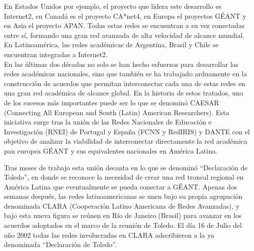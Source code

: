En Estados Unidos por ejemplo, el proyecto que lidera este desarrollo es Internet2\citep{Internet2}, en Canadá es el proyecto CA*net4\citep{Canarie}, en Europa el proyectos GÉANT\citep{GEANT} y en Asia el proyecto APAN\citep{APAN}. Todas estas redes se encuentran a su vez conectadas entre sí, formando una gran red avanzada de alta velocidad de alcance mundial. En Latinoamérica, las redes académicas de Argentina, Brasil y Chile se encuentran integradas a Internet2.\\

En las \'ultimas dos d\'ecadas no solo se han hecho esfuerzos para desarrollar las redes académicas nacionales, sino que también se ha trabajado arduamente en la construcción de acuerdos que permitan interconectar cada una de estas redes en una gran red académica de alcance global. En la historia de estos tratados, uno de los sucesos m\'as importantes puede ser lo que se denomin\'o CAESAR (Connecting All European and South (Latin) American Researchers). Esta iniciativa surge tras la unión de las Redes Nacionales de Educación e Investigación (RNEI) de Portugal y España (FCNN y RedIRIS) y DANTE con el objetivo de analizar la viabilidad de interconectar directamente la red académica pan europea GÉANT y sus equivalentes nacionales en América Latina.


Tras meses de trabajo esta unión decanta en lo que se denomin\'o “Declaración de Toledo”, en donde se reconoce la necesidad de crear una red troncal regional en América Latina que eventualmente se pueda conectar a GÉANT. Apenas dos semanas después, las redes latinoamericanas se unen bajo su propia agrupación denominada CLARA (Cooperación Latino Americana de Redes Avanzadas), y bajo esta nueva figura se reúnen en Río de Janeiro (Brasil) para avanzar en los acuerdos adoptados en el marco de la reunión de Toledo. El día 16 de Julio del año 2002 todas las redes involucradas en CLARA adscribieron a la ya denominada “Declaración de Toledo”.\\

